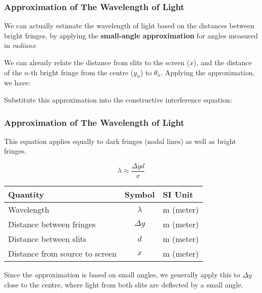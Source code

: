 \documentclass[compress,aspectratio=169]{beamer}
\newcommand{\eq}[2]{\vspace{#1}{\LARGE\begin{displaymath}#2\end{displaymath}}}
\begin{document}
\begin{frame}
  \frametitle{Approximation of The Wavelength of Light}
  We can actually estimate the wavelength of light based on the distances
  between bright fringes, by applying the \textbf{small-angle approximation}
  for angles measured in \emph{radians}:
  
  \eq{-.35in}{
    \theta\approx\tan\theta\approx\sin\theta
  }
  
  \vspace{-.15in}We can already relate the distance from slits to the screen
  ($x$), and the
  distance of the $n$-th bright fringe from the centre ($y_n$) to $\theta_n$.
  Applying the approximation, we have:

  \eq{-.2in}{
    \tan\theta_n=\frac{y_n}{x}\approx\sin\theta_n
  }

  Substitute this approximation into the constructive interference equation:

  \eq{-.2in}{
    n\lambda\approx\frac{y_nd}{x}
    \quad\longrightarrow\quad
    \boxed{\lambda\approx\frac{\Delta y d}{x}}
  }
\end{frame}

\begin{frame}
  \frametitle{Approximation of The Wavelength of Light}
  This equation applies equally to dark fringes (nodal lines) as well as bright
  fringes.
  
  {\LARGE
    \begin{displaymath}
      \boxed{\lambda\approx\frac{\Delta y d}{x}}
    \end{displaymath}
  }
  \begin{center}
    \begin{tabular}{l|c|l}
      \rowcolor{pink}
      \textbf{Quantity} & \textbf{Symbol} & \textbf{SI Unit} \\ \hline
      Wavelength                     & $\lambda$  & \si{\metre} (meter) \\
      Distance between fringes       & $\Delta y$ & \si{\metre} (meter) \\
      Distance between slits         & $d$        & \si{\metre} (meter) \\
      Distance from source to screen & $x$        & \si{\metre} (meter) \\
    \end{tabular}
  \end{center}

  Since the approximation is based on small angles, we generally apply this
  to $\Delta y$ close to the centre, where light from both slits are deflected
  by a small angle.
\end{frame}
\end{document}

